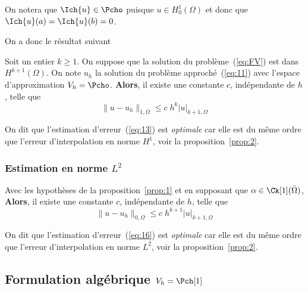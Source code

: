 \begin{remark}
  \label{rem:2}
  On notera que $\Ich{u} \in \Pcho$ puisque $u \in H^1_0(\Omega)$ et donc que
  $\Ich{u}(a)=\Ich{u}(b)=0$.
\end{remark}

On a donc le résultat suivant
\begin{proposition}
  \label{prop:1}
  Soit un entier $k\geq 1$. On suppose que la solution du
  problème~(\ref{eq:FV}) est dans $H^{k+1}(\Omega)$. On note $u_h$ la solution
  du problème approché~(\ref{eq:11}) avec l'espace d'approximation $V_h =
  \Pcho$. \textbf{Alors}, il existe une constante $c$, indépendante de $h$,
  telle que
  \begin{equation}
    \label{eq:13}
        \|u-u_h\|_{1,\Omega} \leq c\; h^k |u|_{k+1,\Omega}
  \end{equation}
\end{proposition}

\begin{remark}
  \label{rem:3}
  On dit que l'estimation d'erreur~(\ref{eq:13}) est \emph{optimale} car elle
  est du même ordre que l'erreur d'interpolation en norme $H^1$, voir la
  proposition~\ref{prop:2}.
\end{remark}


\subsubsection{Estimation en norme $L^2$}
\label{sec:estimation-en-norme}

\begin{proposition}
  \label{prop:3}
  Avec les hypothèses de la proposition~\ref{prop:1} et en supposant que
  $\alpha \in \Ck[1](\bar{\Omega})$, \textbf{Alors}, il existe une constante
  $c$, indépendante de $h$, telle que
  \begin{equation}
    \label{eq:16}
    \|u-u_h\|_{0,\Omega} \leq c\; h^{k+1} |u|_{k+1,\Omega}
  \end{equation}
\end{proposition}

\begin{remark}
  \label{rem:5}
  On dit que l'estimation d'erreur~(\ref{eq:16}) est \emph{optimale} car elle
  est du même ordre que l'erreur d'interpolation en norme $L^2$, voir la
  proposition~\ref{prop:2}.
\end{remark}

\subsection{Formulation algébrique $V_h=\Pch[1]$}
\label{sec:form-algebr}

